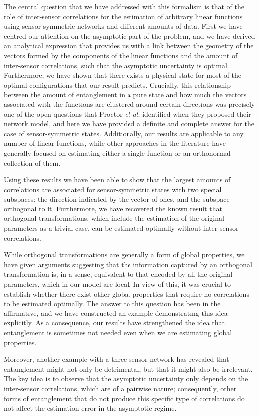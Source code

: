 The central question that we have addressed with this formalism is that of the role of inter-sensor correlations for the estimation of arbitrary linear functions using sensor-symmetric networks and different amounts of data. First we have centred our attention on the asymptotic part of the problem, and we have derived an analytical expression that provides us with a link between the geometry of the vectors formed by the components of the linear functions and the amount of inter-sensor correlations, such that the asymptotic uncertainty is optimal. Furthermore, we have shown that there exists a physical state for most of the optimal configurations that our result predicts. Crucially, this relationship between the amount of entanglement in a pure state and how much the vectors associated with the functions are clustered around certain directions was precisely one of the open questions that Proctor \emph{et al.} \cite{proctor2017networked} identified when they proposed their network model, and here we have provided a definite and complete answer for the case of sensor-symmetric states. Additionally, our results are applicable to any number of linear functions, while other approaches in the literature have generally focused on estimating either a single function or an orthonormal collection of them. 

Using these results we have been able to show that the largest amounts of correlations are associated for sensor-symmetric states with two special subspaces: the direction indicated by the vector of ones, and the subspace orthogonal to it. Furthermore, we have recovered the known result that orthogonal transformations, which include the estimation of the original parameters as a trivial case, can be estimated optimally without inter-sensor correlations.  

While orthogonal transformations are generally a form of global properties, we have given arguments suggesting that the information captured by an orthogonal transformation is, in a sense, equivalent to that encoded by all the original parameters, which in our model are local. In view of this, it was crucial to establish whether there exist other global properties that require no correlations to be estimated optimally. The answer to this question has been in the affirmative, and we have constructed an example demonstrating this idea explicitly. As a consequence, our results have strengthened the idea that entanglement is sometimes not needed even when we are estimating global properties. 

Moreover, another example with a three-sensor network has revealed that entanglement might not only be detrimental, but that it might also be irrelevant. The key idea is to observe that the asymptotic uncertainty only depends on the inter-sensor correlations, which are of a pairwise nature; consequently, other forms of entanglement that do not produce this specific type of correlations do not affect the estimation error in the asymptotic regime. 

